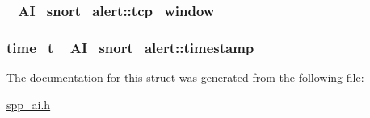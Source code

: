 \label{struct__AI__snort__alert_a4d4cbdbd9675f4c43545547f55174cb7}
\hypertarget{struct__AI__snort__alert_a1687fccc26bb211591db8b36ffec5348}{
\subsubsection[{tcp\_\-window}]{ {\bf \_\-AI\_\-snort\_\-alert::tcp\_\-window}}}
\label{struct__AI__snort__alert_a1687fccc26bb211591db8b36ffec5348}
\hypertarget{struct__AI__snort__alert_a10a67f60ca3da339a2104849a0b2ac19}{
\subsubsection[{timestamp}]{\setlength{\rightskip}{0pt plus 5cm}time\_\-t {\bf \_\-AI\_\-snort\_\-alert::timestamp}}}
\label{struct__AI__snort__alert_a10a67f60ca3da339a2104849a0b2ac19}


The documentation for this struct was generated from the following file:\begin{DoxyCompactItemize}
\item 
\hyperlink{spp__ai_8h}{spp\_\-ai.h}\end{DoxyCompactItemize}
